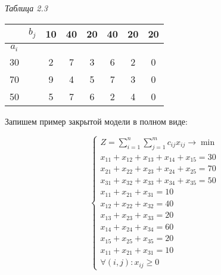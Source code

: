 \documentclass[a4paper,12pt]{article}
\begin{document}
	\begin{flushright}
		\textit{Таблица 2.3}
	\end{flushright}
	\begin{center}
		\begin{tabular}{c|ccccccc}
			\cline{2-8}
			& \multicolumn{1}{c|}{$b_j$} & \multicolumn{1}{c|}{10} & \multicolumn{1}{c|}{40} & \multicolumn{1}{c|}{20} & \multicolumn{1}{c|}{40} & \multicolumn{1}{c|}{20} & \multicolumn{1}{l|}{20} \\ \hline
			\multicolumn{1}{|c|}{$a_i$} &  &  &  &  &  &  & \multicolumn{1}{l}{} \\ \cline{1-1} \cline{3-8} 
			\multicolumn{1}{|c|}{30} & \multicolumn{1}{c|}{} & \multicolumn{1}{c|}{2} & \multicolumn{1}{c|}{7} & \multicolumn{1}{c|}{3} & \multicolumn{1}{c|}{6} & \multicolumn{1}{c|}{2} & \multicolumn{1}{c|}{0} \\ \cline{1-1} \cline{3-8} 
			\multicolumn{1}{|c|}{70} & \multicolumn{1}{c|}{} & \multicolumn{1}{c|}{9} & \multicolumn{1}{c|}{4} & \multicolumn{1}{c|}{5} & \multicolumn{1}{c|}{7} & \multicolumn{1}{c|}{3} & \multicolumn{1}{c|}{0} \\ \cline{1-1} \cline{3-8} 
			\multicolumn{1}{|c|}{50} & \multicolumn{1}{c|}{} & \multicolumn{1}{c|}{5} & \multicolumn{1}{c|}{7} & \multicolumn{1}{c|}{6} & \multicolumn{1}{c|}{2} & \multicolumn{1}{c|}{4} & \multicolumn{1}{c|}{0} \\ \cline{1-1} \cline{3-8} 
		\end{tabular}
	\end{center}

	Запишем пример закрытой модели в полном виде:
	
	\begin{equation}
		\begin{cases}
			Z = \sum\limits_{i=1}^n \sum\limits_{j=1}^m c_{ij}x_{ij} \longrightarrow \min \\
			x_{11} + x_{12} + x_{13} + x_{14} + x_{15} = 30\\
			x_{21} + x_{22} + x_{23} + x_{24} + x_{25} = 70\\
			x_{31} + x_{32} + x_{33} + x_{34} + x_{35} = 50\\
			x_{11} + x_{21} + x_{31} = 10\\
			x_{12} + x_{22} + x_{32} = 40\\
			x_{13} + x_{23} + x_{33} = 20\\
			x_{14} + x_{24} + x_{34} = 60\\
			x_{15} + x_{25} + x_{35} = 20\\
			x_{11} + x_{21} + x_{31} = 10\\ 
			\forall (i,j): x_{ij} \geqslant 0
		\end{cases}
	\end{equation}
	\clearpage
\end{document}
